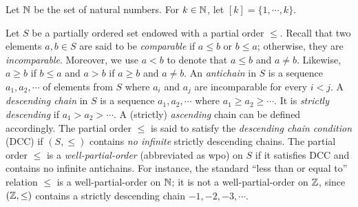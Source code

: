 
Let ${\mathbb{N} }$ be the set of natural numbers. For $k \in {\mathbb{N} }$, let $[k]=\{1,\cdots, k\}$. %

Let $S$ be a partially ordered set endowed with a partial order $\leq$. Recall that two elements $a,b\in S$ are said to be \emph{comparable} if $a\leq b$ or $b\leq a$; otherwise, they are \emph{incomparable}.
Moreover, we use $a < b$ to denote that $a \leq b$ and $a \neq b$. Likewise, $a \geq b$ if $b \leq a$ and $a > b$ if $a \geq b$ and $a \neq b$.
%
An \emph{antichain} in $S$ is a sequence $a_1, a_2, \cdots$ of elements from $S$ where $a_i$ and $a_j$ are incomparable for every $ i < j$.
A \emph{descending chain} in $S$ is a sequence $a_1, a_2, \cdots$ where $a_1 \geq a_2 \geq \cdots$. It is \emph{strictly descending} if $a_1 > a_2 > \cdots$. 
A (strictly) \emph{ascending} chain can be defined accordingly.  
%
The partial order $\leq$ is said to satisfy %
the \emph{descending chain condition} (DCC) if $(S, \leq)$ contains \emph{no infinite} strictly descending chains.
%
The partial order $\leq$ is a \emph{well-partial-order} (abbreviated as wpo) on $S$ if it satisfies DCC and contains no infinite antichains. 
%
%
%
For instance, the standard ``less than or equal to'' relation $\leq$ is a well-partial-order on $\mathbb{N}$; it is not a well-partial-order on $\mathbb{Z}$, since $(\mathbb{Z}, \leq)$ contains a strictly descending chain $-1, -2, -3, \cdots$. 



